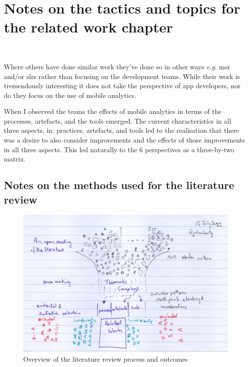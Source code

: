 \section{Notes on the tactics and topics for the related work chapter}~\label{rw-tactics-and-topics-for-this-chapter}

Where others have done similar work they've done so in other ways \emph{e.g.} \Gls{msr} and/or \Glspl{slr} rather than focusing on the development teams. While their work is tremendously interesting it does not take the perspective of app developers, nor do they focus on the use of mobile analytics. 

When I observed the teams the effects of mobile analytics in terms of the processes, artefacts, and the tools emerged. The current characteristics in all three aspects, in: practices, artefacts, and tools led to the realisation that there was a desire to also consider improvements and the effects of those improvements in all three aspects. This led naturally to the 6 perspectives as a three-by-two matrix. 

\subsection{Notes on the methods used for the literature review} \label{rw-notes-on-methods-used-for-literature-review-topic}

\begin{figure}
    \centering
    \includegraphics[width=\textwidth]{images/rough-sketches/literature-review-overview.jpeg}
    \caption{Overview of the literature review process and outcomes}
    \label{fig:literature-review-overview}
\end{figure}

